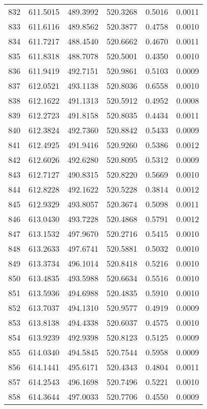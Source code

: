 \documentclass{article}
\begin{document}
\begin{longtable}{|c|c|c|c|c|c|}
832 & 611.5015 & 489.3992 & 520.3268 & 0.5016 & 0.0011 \\
833 & 611.6116 & 489.8562 & 520.3877 & 0.4758 & 0.0010 \\
834 & 611.7217 & 488.4540 & 520.6662 & 0.4670 & 0.0011 \\
835 & 611.8318 & 488.7078 & 520.5001 & 0.4350 & 0.0010 \\
836 & 611.9419 & 492.7151 & 520.9861 & 0.5103 & 0.0009 \\
837 & 612.0521 & 493.1138 & 520.8036 & 0.6558 & 0.0010 \\
838 & 612.1622 & 491.1313 & 520.5912 & 0.4952 & 0.0008 \\
839 & 612.2723 & 491.8158 & 520.8035 & 0.4434 & 0.0011 \\
840 & 612.3824 & 492.7360 & 520.8842 & 0.5433 & 0.0009 \\
841 & 612.4925 & 491.9416 & 520.9260 & 0.5386 & 0.0012 \\
842 & 612.6026 & 492.6280 & 520.8095 & 0.5312 & 0.0009 \\
843 & 612.7127 & 490.8315 & 520.8220 & 0.5669 & 0.0010 \\
844 & 612.8228 & 492.1622 & 520.5228 & 0.3814 & 0.0012 \\
845 & 612.9329 & 493.8057 & 520.3674 & 0.5098 & 0.0011 \\
846 & 613.0430 & 493.7228 & 520.4868 & 0.5791 & 0.0012 \\
847 & 613.1532 & 497.9670 & 520.2716 & 0.5415 & 0.0010 \\
848 & 613.2633 & 497.6741 & 520.5881 & 0.5032 & 0.0010 \\
849 & 613.3734 & 496.1014 & 520.8418 & 0.5216 & 0.0010 \\
850 & 613.4835 & 493.5988 & 520.6634 & 0.5516 & 0.0010 \\
851 & 613.5936 & 494.6988 & 520.4835 & 0.5910 & 0.0010 \\
852 & 613.7037 & 494.1310 & 520.9577 & 0.4919 & 0.0009 \\
853 & 613.8138 & 494.4338 & 520.6037 & 0.4575 & 0.0010 \\
854 & 613.9239 & 492.9398 & 520.8123 & 0.5125 & 0.0009 \\
855 & 614.0340 & 494.5845 & 520.7544 & 0.5958 & 0.0009 \\
856 & 614.1441 & 495.6171 & 520.4343 & 0.4804 & 0.0011 \\
857 & 614.2543 & 496.1698 & 520.7496 & 0.5221 & 0.0010 \\
858 & 614.3644 & 497.0033 & 520.7706 & 0.4550 & 0.0009 \\

\end{longtable}
\end{document}

